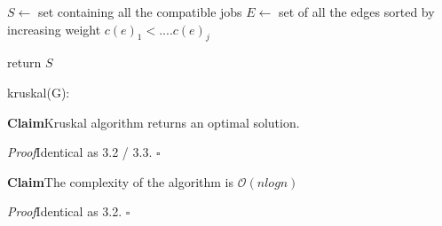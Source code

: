 \documentclass[11pt]{article}
\newenvironment{claim}[1]{\par\textbf{Claim}\space#1}{}
\newenvironment{proof}[1]{\\\par\textit{Proof}\space#1}{\hfill\ensuremath{\square}}
\begin{document}
\begin{algorithm}[H]
\SetAlgoLined
\small
{}
\BlankLine

$S \leftarrow$ set containing all the compatible jobs\;
$E \leftarrow$ set of all the edges sorted by increasing weight $c(e)_{1} < .... c(e)_{j}$

\BlankLine


\BlankLine

return $S$\;
\caption{kruskal(G):}
\end{algorithm}

\begin{claim}
Kruskal algorithm returns an optimal solution.
\end{claim}
\begin{proof}
Identical as 3.2 / 3.3.
\end{proof}\\
 
\begin{claim}
The complexity of the algorithm is $\mathcal{O}{(nlogn)}$
\end{claim}
\begin{proof}
Identical as 3.2.
\end{proof}\\
\end{document}
